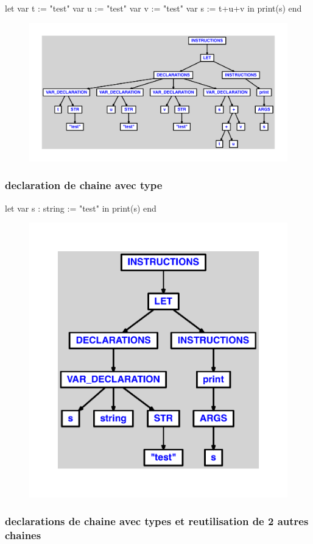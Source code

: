 \documentclass{article}
\begin{document}
\begin{verbatimtab}
let
	var t := "test"
	var u := "test"
	var v := "test"
	var s := t+u+v
in
	print(s)
end
\end{verbatimtab}
\begin{figure}[H]\centering\includegraphics[max width=\textwidth]{ast/ast_302.pdf}\end{figure}\subsubsection{declaration de chaine avec type}
\begin{verbatimtab}
let
	var s : string := "test"
in
	print(s)
end
\end{verbatimtab}
\begin{figure}[H]\centering\includegraphics[max width=\textwidth]{ast/ast_303.pdf}\end{figure}\subsubsection{declarations de chaine avec types et reutilisation de 2 autres chaines}
\end{document}
